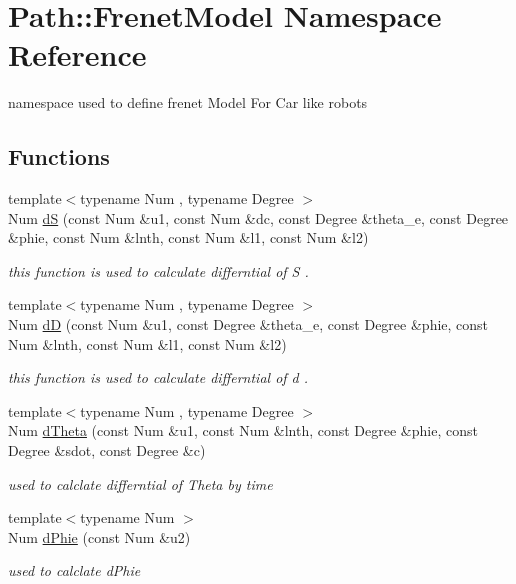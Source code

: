 \hypertarget{namespace_path_1_1_frenet_model}{}\section{Path\+:\+:Frenet\+Model Namespace Reference}
\label{namespace_path_1_1_frenet_model}


namespace used to define frenet Model For Car like robots  


\subsection*{Functions}
\begin{DoxyCompactItemize}
\item 
{\footnotesize template$<$typename Num , typename Degree $>$ }\\Num \hyperlink{namespace_path_1_1_frenet_model_aad575bf8ab643cee69a04fd260537bf5}{dS} (const Num \&u1, const Num \&dc, const Degree \&theta\+\_\+e, const Degree \&phie, const Num \&lnth, const Num \&l1, const Num \&l2)
\begin{DoxyCompactList}\small\item\em this function is used to calculate differntial of S . \end{DoxyCompactList}\item 
{\footnotesize template$<$typename Num , typename Degree $>$ }\\Num \hyperlink{namespace_path_1_1_frenet_model_ad4b6f15d18cda83a0b49196c7e4c39a7}{dD} (const Num \&u1, const Degree \&theta\+\_\+e, const Degree \&phie, const Num \&lnth, const Num \&l1, const Num \&l2)
\begin{DoxyCompactList}\small\item\em this function is used to calculate differntial of d . \end{DoxyCompactList}\item 
{\footnotesize template$<$typename Num , typename Degree $>$ }\\Num \hyperlink{namespace_path_1_1_frenet_model_a353a17af4ea254880a0186a6d82a98bc}{d\+Theta} (const Num \&u1, const Num \&lnth, const Degree \&phie, const Degree \&sdot, const Degree \&c)
\begin{DoxyCompactList}\small\item\em used to calclate differntial of Theta by time \end{DoxyCompactList}\item 
{\footnotesize template$<$typename Num $>$ }\\Num \hyperlink{namespace_path_1_1_frenet_model_a5412f0a54c36b34975e06b311a411122}{d\+Phie} (const Num \&u2)
\begin{DoxyCompactList}\small\item\em used to calclate d\+Phie \end{DoxyCompactList}\end{DoxyCompactItemize}


